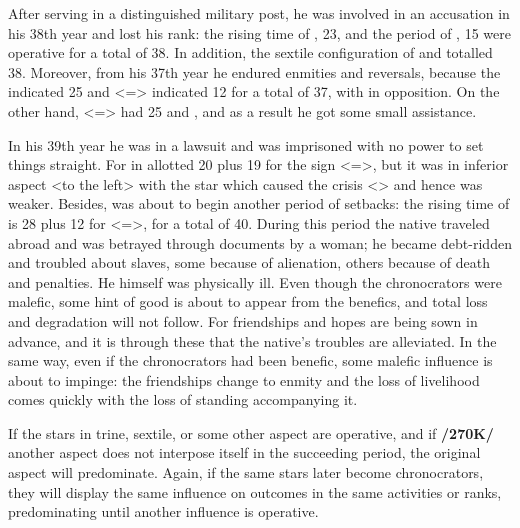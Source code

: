 After serving in a distinguished military post, he was involved in an accusation in his 38th year and lost his rank: the rising time of \Taurus, 23, and the period of \Mars, 15 were operative for a total of 38. In addition, the sextile configuration of \Saturn\xspace and \Venus\xspace totalled 38. Moreover, from his 37th year he endured enmities and reversals, because the \Moon\xspace indicated 25 and \Sagittarius\xspace <=\Jupiter> indicated 12 for a total of 37, with \Saturn\xspace in opposition. On the other hand, \Cancer\xspace <=\Moon> had 25 and \Jupiter\xspace 12, and as a result he got some small assistance. 

In his 39th year he was in a lawsuit and was imprisoned with no power to set things straight. For \Mercury\xspace in \Leo allotted 20
plus 19 for the sign <=\Sun>, but it was in inferior aspect <\Sextile to the left> with the star which caused the crisis <\Saturn> and hence was weaker. Besides, \Saturn\xspace was about to begin another period of setbacks: the rising time of \Gemini\xspace is 28 plus 12 for \Sagittarius\xspace <=\Jupiter>, for a total of 40. During this period the native traveled abroad and was betrayed through documents by a woman; he became debt-ridden and troubled about slaves, some because of alienation, others because of death and penalties. He himself was physically ill. Even though the chronocrators were malefic, some hint of good is about to appear from the benefics, and total loss and degradation will not follow. For friendships and hopes are being sown in advance, and it is through these that the native’s troubles are alleviated. In the same way, even if the chronocrators had been benefic, some malefic influence is about to impinge: the friendships change to enmity and the loss of livelihood comes quickly with the loss of standing accompanying it. 

If the stars in trine, sextile, or some other aspect are operative, and if \textbf{/270K/} another aspect does not interpose itself in the succeeding period, the original aspect will predominate. Again, if the same stars later become chronocrators, they will display the same influence on outcomes in the same activities or ranks, predominating until another influence is operative.

